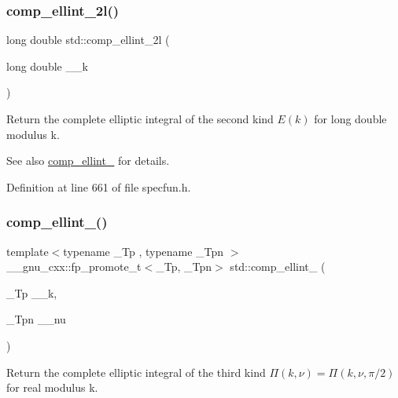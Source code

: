 \subsubsection{\texorpdfstring{comp\+\_\+ellint\+\_\+2l()}{comp\_ellint\_2l()}}
{\footnotesize\ttfamily long double std\+::comp\+\_\+ellint\+\_\+2l (\begin{DoxyParamCaption}\item[{long double}]{\+\_\+\+\_\+k }\end{DoxyParamCaption})\hspace{0.3cm}{\ttfamily [inline]}}

Return the complete elliptic integral of the second kind $ E(k) $ for {\ttfamily long double} modulus {\ttfamily k}.

\begin{DoxySeeAlso}{See also}
\hyperlink{group__mathsf__std_gaadf288465eea84ec609d93de96200aaa}{comp\+\_\+ellint\+\_} for details. 
\end{DoxySeeAlso}


Definition at line 661 of file specfun.\+h.

\mbox{\label{group__mathsf__std_ga80419d323d3231870bd588525e818974}} 
\subsubsection{\texorpdfstring{comp\+\_\+ellint\+\_()}{comp\_ellint\_3()}}
{\footnotesize\ttfamily template$<$typename \+\_\+\+Tp , typename \+\_\+\+Tpn $>$ \\
\+\_\+\+\_\+gnu\+\_\+cxx\+::fp\+\_\+promote\+\_\+t$<$\+\_\+\+Tp, \+\_\+\+Tpn$>$ std\+::comp\+\_\+ellint\+\_ (\begin{DoxyParamCaption}\item[{\+\_\+\+Tp}]{\+\_\+\+\_\+k,  }\item[{\+\_\+\+Tpn}]{\+\_\+\+\_\+nu }\end{DoxyParamCaption})\hspace{0.3cm}{\ttfamily [inline]}}

Return the complete elliptic integral of the third kind $ \Pi(k,\nu) = \Pi(k,\nu,\pi/2) $ for real modulus {\ttfamily k}.

